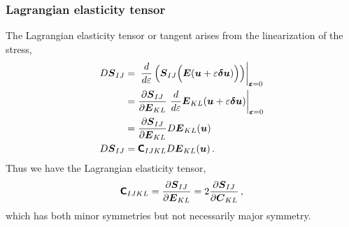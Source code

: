 \documentclass[10pt,letterpaper,oneside]{report}
\newcommand{\ten}[1]{\mbox{\boldmath $#1$}{}}
\newcommand{\tenf}[1]{\mbox{{\sffamily{\bfseries {#1}}}}}
\newcommand{\tens}[1]{\mbox{\boldmath{\scriptsize{$#1$}}}{}}
\begin{document}
\subsubsection{Lagrangian elasticity tensor}
The Lagrangian elasticity tensor or tangent arises from the linearization of the stress, 
\begin{align}
D \ten{S}_{IJ} ={}& \left. \frac{d }{d \varepsilon} \left( \ten{S}_{IJ} \Big( \ten{E} (\ten{u} + \varepsilon \ten{\delta u} ) \Big) \right) \right|_{\tens{\varepsilon} = 0} 
\\
={}& \frac{ \partial \ten{S}_{IJ} }{ \partial \ten{E}_{KL} } \left. \frac{d }{d \varepsilon} \ten{E}_{KL} (\ten{u} + \varepsilon \ten{\delta u} ) \right|_{\tens{\varepsilon} = 0} 
\notag \\
={}& \frac{ \partial \ten{S}_{IJ} }{ \partial \ten{E}_{KL} }  D \ten{E}_{KL} (\ten{u} ) 
\notag \\
D \ten{S}_{IJ} ={}& \tenf{C}_{IJKL} D \ten{E}_{KL} (\ten{u} ) \, . 
\end{align}
Thus we have the Lagrangian elasticity tensor, 
\begin{equation}
\tenf{C}_{IJKL} = \frac{ \partial \ten{S}_{IJ} }{ \partial \ten{E}_{KL} } = 2 \frac{ \partial \ten{S}_{IJ} }{ \partial \ten{C}_{KL} } \, , 
\end{equation}
which has both minor symmetries but not necessarily major symmetry.  
\end{document}
